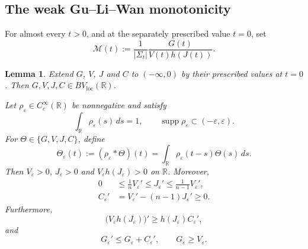\documentclass[11pt,reqno]{amsart}
\numberwithin{equation}{section}
\newtheorem{lemma}[theorem]{Lemma}
\theoremstyle{definition}
\begin{document}
\subsection{The weak Gu--Li--Wan monotonicity}
For almost every $t>0$, and at the separately prescribed value $t=0$, set
\begin{equation}\label{s4.M}
    \mathcal M(t):=\frac{1}{|\Sigma_t|}
    \frac{G(t)}{V(t)h(J(t))}.
\end{equation}
\begin{lemma}
\label{lem:hyp-D-estimate}
Extend $G$, $V$, $J$ and $C$ to $(-\infty,0)$ by their prescribed values at $t=0$. Then $G,V,J,C\in BV_{\mathrm{loc}}(\mathbb R)$.

Let $\rho_\varepsilon\in C_c^\infty(\mathbb R)$ be nonnegative and
satisfy
\begin{equation*}
    \int_{\mathbb R}\rho_\varepsilon(s)\,ds=1,
    \qquad
    \operatorname{supp}\rho_\varepsilon
    \subset(-\varepsilon,\varepsilon).
\end{equation*}
For $\Theta\in\{G,V,J,C\}$, define
\begin{equation*}
    \Theta_\varepsilon(t)
    :=(\rho_\varepsilon*\Theta)(t)
    =\int_{\mathbb R}\rho_\varepsilon(t-s)\Theta(s)\,ds.
\end{equation*}
Then $V_\varepsilon>0$, $J_\varepsilon>0$ and
$V_\varepsilon h(J_\varepsilon)>0$ on $\mathbb R$. Moreover, \begin{equation}\label{eq:hyp-mollified-measures}
\begin{aligned}
    0
    &\leq\frac1nV_\varepsilon'
    \leq J_\varepsilon'
    \leq\frac1{n-1}V_\varepsilon',\\
    C_\varepsilon'
    &=V_\varepsilon'-(n-1)J_\varepsilon'
    \geq0.
\end{aligned}
\end{equation}
Furthermore,
\begin{equation}\label{eq:hyp-mollified-D}
    \bigl(V_\varepsilon h(J_\varepsilon)\bigr)'
    \geq h(J_\varepsilon)C_\varepsilon',
\end{equation}
and
\begin{equation}\label{eq:hyp-mollified-G}
    G_\varepsilon'
    \leq G_\varepsilon+C_\varepsilon',
    \qquad
    G_\varepsilon\geq V_\varepsilon.
\end{equation}
\end{lemma}
\end{document}
